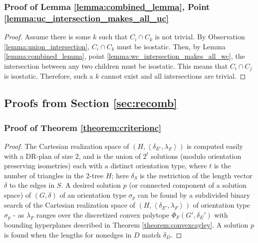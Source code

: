 \subsubsection{Proof of Lemma \ref{lemma:combined_lemma}, Point \ref{lemma:uc_intersection_makes_all_uc}}

\begin{proof}
Assume there is some $k$ such that $C_i\cap C_k$ is not trivial. By Observation \ref{lemma:union_intersection}, $C_i\cap C_k$ must be isostatic. Then, by Lemma \ref{lemma:combined_lemma}, point \ref{lemma:wc_intersection_makes_all_wc}, the intersection between any two children must be isostatic. This means that $C_i\cap C_j$ is isostatic. Therefore, such a $k$ cannot exist and all intersections are trivial.
\end{proof}






\subsection{Proofs from Section \ref{sec:recomb}}



\subsubsection{Proof of Theorem \ref{theorem:criterionc}}
\begin{proof}
    The Cartesian realization space of $(H,\left<\delta_{E'}, \lambda_F\right>)$ is computed easily with a DR-plan of size 2, and is the union of $2^t$ solutions (modulo orientation preserving isometries) each with a distinct orientation type, where $t$ is the number of triangles in the 2-tree $H$; here $\delta_{S}$ is the restriction of the length vector $\delta$ to the edges in $S$. A desired solution $p$ (or connected component of a solution space) of $(G,\delta)$ of an orientation type $\sigma_p$ can be found by a subdivided binary search   of the Cartesian realization space of $(H, \left<\delta_{E'}, \lambda_F\right>)$ of orientation type $\sigma_p$ - as $\lambda_F$ ranges over the discretized convex polytope $\Phi_F(G',\delta_E')$ with bounding hyperplanes described in Theorem \ref{theorem:convexcayley}. A solution $p$ is found  when the lengths for nonedges in $D$ match $\delta_D$.
\end{proof}


